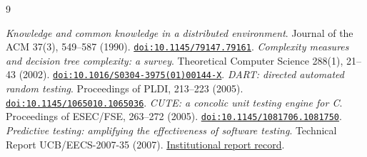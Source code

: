 \documentclass[11pt,letterpaper]{article}
\newcommand{\doi}[1]{\href{https://doi.org/#1}{\texttt{doi:#1}}}
\begin{document}
\begin{thebibliography}{9}
\small\raggedright
\setlength{\itemsep}{2pt}
\emph{Knowledge and common knowledge in a distributed environment}.
Journal of the ACM 37(3), 549--587 (1990). \doi{10.1145/79147.79161}.
\emph{Complexity measures and decision tree complexity: a survey}.
Theoretical Computer Science 288(1), 21--43 (2002).
\doi{10.1016/S0304-3975(01)00144-X}.
\emph{DART: directed automated random testing}.
Proceedings of PLDI, 213--223 (2005). \doi{10.1145/1065010.1065036}.
\emph{CUTE: a concolic unit testing engine for C}.
Proceedings of ESEC/FSE, 263--272 (2005). \doi{10.1145/1081706.1081750}.
\emph{Predictive testing: amplifying the effectiveness of software testing}.
Technical Report UCB/EECS-2007-35 (2007).
\href{https://www2.eecs.berkeley.edu/Pubs/TechRpts/2007/EECS-2007-35.html}{Institutional report record}.
\end{thebibliography}
\end{document}

